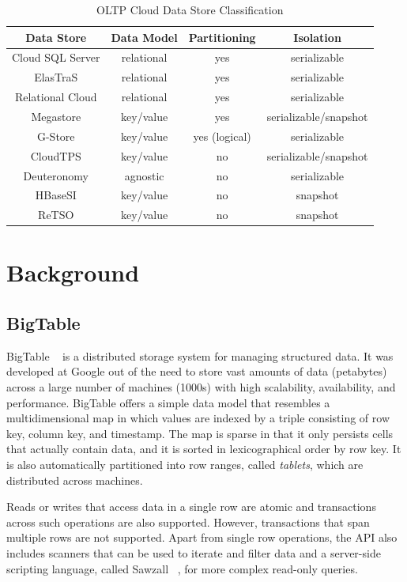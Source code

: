 \documentclass[10pt,final,journal]{IEEEtran}
\begin{document}
\begin{table}[!t]
\renewcommand{\arraystretch}{1.3}
\caption{OLTP Cloud Data Store Classification}
\label{classification}
\centering
\begin{tabular}{|c|c|c|c|}
\hline
\bfseries Data Store  & \bfseries Data Model & \bfseries  Partitioning & \bfseries Isolation \\
\hline
\hline
Cloud SQL Server & relational & yes & serializable \\
ElasTraS & relational & yes & serializable \\
Relational Cloud & relational & yes & serializable \\
Megastore & key/value & yes & serializable/snapshot \\
G-Store & key/value & yes (logical) & serializable \\
CloudTPS & key/value & no & serializable/snapshot \\
Deuteronomy & agnostic & no &serializable \\
HBaseSI & key/value & no & snapshot \\
ReTSO & key/value & no & snapshot \\
\hline
\end{tabular}
\end{table}



\section{Background}

\subsection{BigTable}
BigTable ~\cite{Chang:2006:BDS:1267308.1267323} is a distributed storage system for managing structured data. It was developed at Google out of the need to store vast amounts of data (petabytes) across a large number of machines (1000s) with high scalability, availability, and performance. BigTable offers a simple data model that resembles a multidimensional map in which values are indexed by a triple consisting of row key, column key, and timestamp. The map is sparse in that it only persists cells that actually contain data, and it is sorted in lexicographical order by row key. It is also automatically partitioned into row ranges, called \emph{tablets}, which are distributed across machines.

Reads or writes that access data in a single row are atomic and transactions across such operations are also supported. However, transactions that span multiple rows are not supported. Apart from single row operations, the API also includes scanners that can be used to iterate and filter data and a server-side scripting language, called Sawzall ~\cite{Pike:2005}, for more complex read-only queries.
\end{document}
